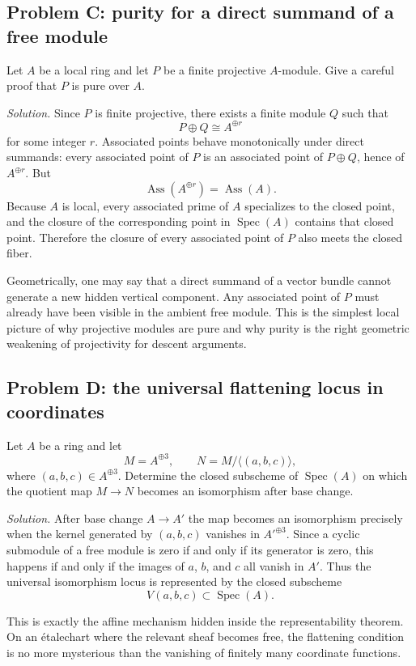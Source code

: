 \documentclass[11pt,oneside]{article}
\newcommand{\Spec}{\operatorname{Spec}}
\newcommand{\Ass}{\operatorname{Ass}}
\newcommand{\etale}{\'etale}
\begin{document}
\subsection*{Problem C: purity for a direct summand of a free module}

Let $A$ be a local ring and let $P$ be a finite projective $A$-module.  Give a careful proof that $P$ is pure over $A$.

\emph{Solution.}  Since $P$ is finite projective, there exists a finite module $Q$ such that
\[
P\oplus Q\cong A^{\oplus r}
\]
for some integer $r$.  Associated points behave monotonically under direct summands: every associated point of $P$ is an associated point of $P\oplus Q$, hence of $A^{\oplus r}$.  But
\[
\Ass(A^{\oplus r})=\Ass(A).
\]
Because $A$ is local, every associated prime of $A$ specializes to the closed point, and the closure of the corresponding point in $\Spec(A)$ contains that closed point.  Therefore the closure of every associated point of $P$ also meets the closed fiber.

Geometrically, one may say that a direct summand of a vector bundle cannot generate a new hidden vertical component.  Any associated point of $P$ must already have been visible in the ambient free module.  This is the simplest local picture of why projective modules are pure and why purity is the right geometric weakening of projectivity for descent arguments.

\subsection*{Problem D: the universal flattening locus in coordinates}

Let $A$ be a ring and let
\[
M=A^{\oplus 3},
\qquad N=M/\langle (a,b,c)\rangle,
\]
where $(a,b,c)\in A^{\oplus 3}$.  Determine the closed subscheme of $\Spec(A)$ on which the quotient map $M\to N$ becomes an isomorphism after base change.

\emph{Solution.}  After base change $A\to A'$ the map becomes an isomorphism precisely when the kernel generated by $(a,b,c)$ vanishes in $A'^{\oplus 3}$.  Since a cyclic submodule of a free module is zero if and only if its generator is zero, this happens if and only if the images of $a$, $b$, and $c$ all vanish in $A'$.  Thus the universal isomorphism locus is represented by the closed subscheme
\[
V(a,b,c)\subset \Spec(A).
\]

This is exactly the affine mechanism hidden inside the representability theorem.  On an \etale chart where the relevant sheaf becomes free, the flattening condition is no more mysterious than the vanishing of finitely many coordinate functions.
\end{document}
